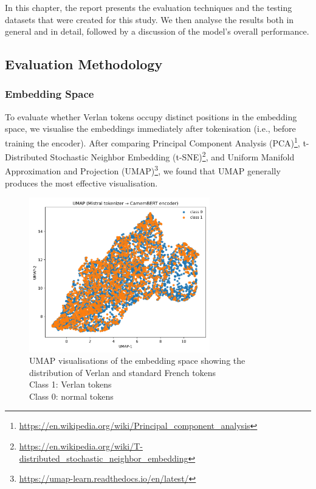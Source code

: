 \documentclass[12pt]{article}
\begin{document}
In this chapter, the report presents the evaluation techniques and the testing datasets that were created for this study. 
We then analyse the results both in general and in detail, followed by a discussion of the model's overall performance.

\subsection{Evaluation Methodology}

\subsubsection{Embedding Space}
To evaluate whether Verlan tokens occupy distinct positions in the embedding space, 
we visualise the embeddings immediately after tokenisation (i.e., before training the encoder). 
After comparing Principal Component Analysis (PCA)\footnote{\url{https://en.wikipedia.org/wiki/Principal_component_analysis}}, 
t-Distributed Stochastic Neighbor Embedding (t-SNE)\footnote{\url{https://en.wikipedia.org/wiki/T-distributed_stochastic_neighbor_embedding}}, 
and Uniform Manifold Approximation and Projection (UMAP)\footnote{\url{https://umap-learn.readthedocs.io/en/latest/}}, 
we found that UMAP generally produces the most effective visualisation\cite{pearson1901pca,maaten2008tsne,mcinnes2018umap}.

\begin{figure}[H]
    \centering
    \includegraphics[width=0.7\textwidth]{figures/mistral_bert_umap.png}
    \caption{UMAP visualisations of the embedding space showing the distribution of Verlan and standard French tokens\\Class 1: Verlan tokens\\Class 0: normal tokens}
    \label{fig:umap_comparison}
\end{figure}
\end{document}
